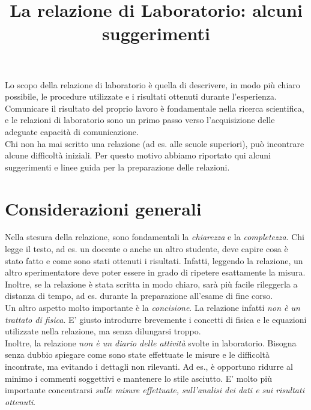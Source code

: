 \documentclass{lab1-article}
\title{La relazione di Laboratorio: alcuni suggerimenti}
\begin{document}
\begin{article}

\maketitle

\secsummary
Lo scopo della relazione di laboratorio \`e quella di descrivere, in modo pi\`u chiaro possibile, le procedure utilizzate e i
risultati ottenuti durante l'esperienza.\\ 
Comunicare il risultato del proprio lavoro \`e fondamentale nella ricerca scientifica,
e le relazioni di laboratorio sono un primo passo verso l'acquisizione delle adeguate capacit\`a di comunicazione.\\
Chi non ha mai scritto una relazione (ad es. alle scuole superiori), pu\`o incontrare alcune difficolt\`a iniziali. Per
questo motivo abbiamo riportato qui alcuni suggerimenti e linee guida per la preparazione delle relazioni.
\section{Considerazioni generali}
Nella stesura della relazione, sono fondamentali la \emph{chiarezza} e la \emph{completezza}. Chi legge il testo, ad es. un
docente o anche un altro studente, deve capire cosa \`e stato fatto e come sono stati ottenuti i risultati. Infatti, leggendo
la relazione, un altro sperimentatore deve poter essere in grado di ripetere esattamente la misura. Inoltre, se la
relazione \`e stata scritta in modo chiaro, sar\`a pi\`u facile rileggerla a distanza di tempo, ad es. durante la
preparazione all'esame di fine corso.\\
Un altro aspetto molto importante \`e la \emph{concisione}. La relazione infatti \emph{non \`e un trattato di fisica}. E' giusto introdurre
brevemente i concetti di fisica e le equazioni utilizzate nella relazione, ma senza dilungarsi troppo.\\ 
Inoltre, la relazione
\emph{non \`e un diario delle attivit\`a} svolte in laboratorio. Bisogna senza dubbio spiegare come sono state effettuate le misure
e le difficolt\`a incontrate, ma evitando i dettagli non rilevanti. Ad es., \`e opportuno ridurre al minimo i commenti
soggettivi e mantenere lo stile asciutto. E' molto pi\`u importante concentrarsi \emph{sulle misure effettuate, sull'analisi dei dati
e sui risultati ottenuti}.

\end{article}
\end{document}
